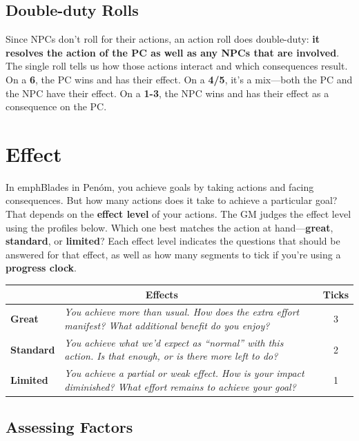 \subsection{Double-duty Rolls}

Since NPCs don’t roll for their actions, an action roll does double-duty: \textbf{it resolves the action of the PC as well as any NPCs that are involved}. The single roll tells us how those actions interact and which consequences result. On a \textbf{6}, the PC wins and has their effect. On a \textbf{4/5}, it’s a mix—both the PC and the NPC have their effect. On a \textbf{1-3}, the NPC wins and has their effect as a consequence on the PC.


\section{Effect}

In emph{Blades in Penóm}, you achieve goals by taking actions and facing consequences. But how many actions does it take to achieve a particular goal? That depends on the \textbf{effect level} of your actions. The GM judges the effect level using the profiles below. Which one best matches the action at hand---\textbf{great}, \textbf{standard}, or \textbf{limited}? Each effect level indicates the questions that should be answered for that effect, as well as how many segments to tick if you’re using a \textbf{progress clock}.

\begin{center}\begin{tabular}{|l|m{8cm}|c|}
\hline
\multicolumn{2}{|c|}{\textbf{Effects}} & \textbf{Ticks} \\
\hline
\textbf{Great} & \emph{You achieve more than usual. How does the extra effort manifest? What additional benefit do you enjoy?} & 3 \\
\hline
\textbf{Standard} & \emph{You achieve what we’d expect as ``normal'' with this action. Is that enough, or is there more left to do?} & 2\\
\hline
\textbf{Limited} & \emph{You achieve a partial or weak effect. How is your impact diminished? What effort remains to achieve your goal?} & 1 \\
\hline
\end{tabular}\end{center}

\subsection{Assessing Factors}

